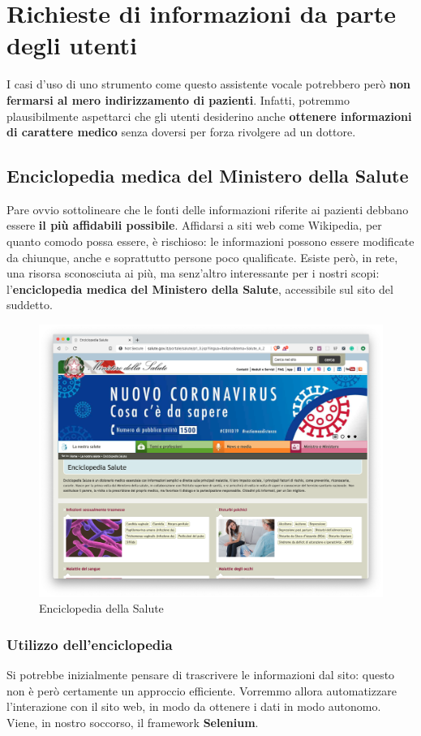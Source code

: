 \chapter{Richieste di informazioni da parte degli utenti}
\label{chap:informations}
I casi d'uso di uno strumento come questo assistente vocale potrebbero però \textbf{non fermarsi al mero indirizzamento di pazienti}. Infatti, potremmo plausibilmente aspettarci che gli utenti desiderino anche \textbf{ottenere informazioni di carattere medico} senza doversi per forza rivolgere ad un dottore.
\section{Enciclopedia medica del Ministero della Salute}
Pare ovvio sottolineare che le fonti delle informazioni riferite ai pazienti debbano essere \textbf{il più affidabili possibile}. Affidarsi a siti web come Wikipedia, per quanto comodo possa essere, è rischioso: le informazioni possono essere modificate da chiunque, anche e soprattutto persone poco qualificate.
Esiste però, in rete, una risorsa sconosciuta ai più, ma senz'altro interessante per i nostri scopi: l'\textbf{enciclopedia medica del Ministero della Salute}, accessibile sul sito del suddetto.
\begin{figure}[H]
    \begin{center}
        \includegraphics[width=0.8\columnwidth]{images/informations/MinSalute.png}
    \end{center}
    \caption{Enciclopedia della Salute}
    \label{fig:min-salute}
\end{figure}
\subsection{Utilizzo dell'enciclopedia}
Si potrebbe inizialmente pensare di trascrivere le informazioni dal sito: questo non è però certamente un approccio efficiente. Vorremmo allora automatizzare l'interazione con il sito web, in modo da ottenere i dati in modo autonomo. Viene, in nostro soccorso, il framework \textbf{Selenium}.
